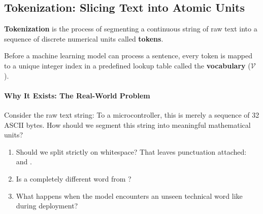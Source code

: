 \subsection{Tokenization: Slicing Text into Atomic Units}\label{subsec:tokenization}

\begin{keyidea}
\textbf{Tokenization} is the process of segmenting a continuous string of raw text into a sequence of discrete numerical units called \textbf{tokens}. 

Before a machine learning model can process a sentence, every token is mapped to a unique integer index in a predefined lookup table called the \textbf{vocabulary} ($\mathcal{V}$).
\end{keyidea}

\paragraph{Why It Exists: The Real-World Problem}
Consider the raw text string:  
To a microcontroller, this is merely a sequence of 32 ASCII bytes. How should we segment this string into meaningful mathematical units?
\begin{enumerate}
    \item Should we split strictly on whitespace? That leaves punctuation attached:  and .
    \item Is  a completely different word from ?
    \item What happens when the model encounters an unseen technical word like  during deployment?
\end{enumerate}

